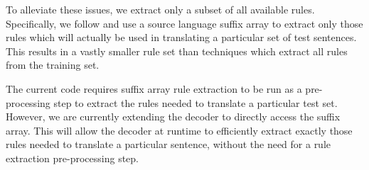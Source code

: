 \documentclass[11pt]{article}
\begin{document}

To alleviate these issues, we extract only a subset of all available rules. Specifically, we follow  and use a source language suffix array to extract only those rules which will actually be used in translating a particular set of test sentences. This results in a vastly smaller rule set than techniques which extract all rules from the training set.

The current code requires suffix array rule extraction to be run as a pre-processing step to extract the rules needed to translate a particular test set. However, we are currently extending the decoder to directly access the suffix array. This will allow the decoder at runtime to efficiently extract exactly those rules needed to translate a particular sentence, without the need for a rule extraction pre-processing step.


%






\end{document}
